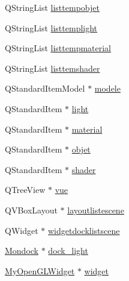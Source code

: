 \begin{DoxyCompactItemize}
\item 
Q\+String\+List \hyperlink{class_main_window_aefc66839b56eea01fa7b8b49ab5182a7}{listtempobjet}
\item 
Q\+String\+List \hyperlink{class_main_window_a2da91caa3f9e740cb7a50e110516212e}{listtemplight}
\item 
Q\+String\+List \hyperlink{class_main_window_a6eb445b9be6c49cf139c74b356ef7e58}{listtempmaterial}
\item 
Q\+String\+List \hyperlink{class_main_window_a889162c5299f284129bec68a0cc45cbf}{listtemshader}
\item 
Q\+Standard\+Item\+Model $\ast$ \hyperlink{class_main_window_abb752b382e336483740c8e0ad21cbcf5}{modele}
\item 
Q\+Standard\+Item $\ast$ \hyperlink{class_main_window_a36a5d988881c1ce38d0692ed500067e1}{light}
\item 
Q\+Standard\+Item $\ast$ \hyperlink{class_main_window_ad89e3c0f75025021cddb58c4cdd5edd8}{material}
\item 
Q\+Standard\+Item $\ast$ \hyperlink{class_main_window_ac76a7b94394a43600a0719ce4af388fc}{objet}
\item 
Q\+Standard\+Item $\ast$ \hyperlink{class_main_window_a8e49ee04eabb719ac4be13ba8cd3fe38}{shader}
\item 
Q\+Tree\+View $\ast$ \hyperlink{class_main_window_ac0150259862bd3b40a76b35a00b9e97a}{vue}
\item 
Q\+V\+Box\+Layout $\ast$ \hyperlink{class_main_window_ab25fb184d802450a71a998cf113d481a}{layoutlistescene}
\item 
Q\+Widget $\ast$ \hyperlink{class_main_window_a38d553a96a3898e65b500c639673b8de}{widgetdocklistscene}
\item 
\hyperlink{class_mondock}{Mondock} $\ast$ \hyperlink{class_main_window_af9acaaae5d4e102aa790a65c01430160}{dock\+\_\+light}
\item 
\hyperlink{class_my_open_g_l_widget}{My\+Open\+G\+L\+Widget} $\ast$ \hyperlink{class_main_window_a0a21ff789dee5a19a74d2461cf0820dc}{widget}
\end{DoxyCompactItemize}


